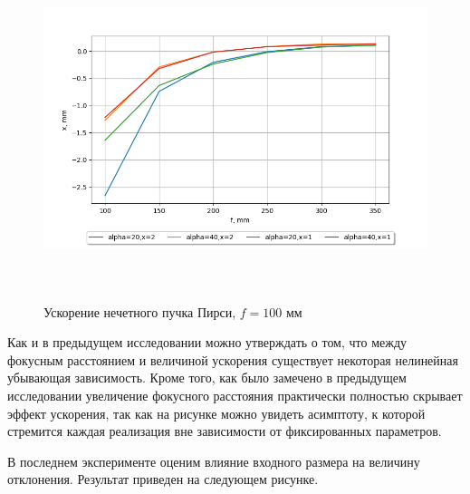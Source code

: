 {    \begin{figure}[H]
        \centering
        \includegraphics[height = 10cm]{plots/!graphics_acc_focus.png}
        \caption{Ускорение нечетного пучка Пирси, $f = 100$ мм}
        \label{acc_focus}
    \end{figure}
      \vspace{0.5cm}
    Как и в предыдущем исследовании можно утверждать о том, что между фокусным расстоянием и величиной ускорения существует некоторая нелинейная убывающая зависимость.
    Кроме того, как было замечено в предыдущем исследовании увеличение фокусного расстояния практически полностью скрывает эффект ускорения, так как на рисунке
    можно увидеть асимптоту, к которой стремится каждая реализация вне зависимости от фиксированных параметров.

    В последнем эксперименте оценим влияние входного размера на величину отклонения. Результат приведен на следующем рисунке.

}
